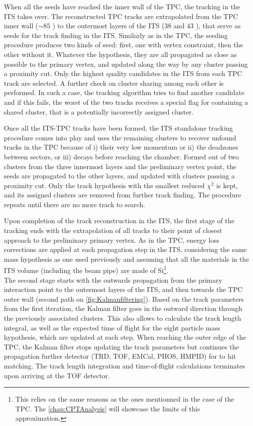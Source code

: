When all the seeds have reached the inner wall of the TPC, the tracking in the ITS takes over. The reconstructed TPC tracks are extrapolated from the TPC inner wall ($\sim 85$ \cm) to the outermost layers of the ITS (38 and 43 \cm), that serve as seeds for the track finding in the ITS. Similarly as in the TPC, the seeding procedure produces two kinds of seed: first, one with vertex constraint, then the other without it. Whatever the hypothesis, they are all propagated as close as possible to the primary vertex, and updated along the way by any cluster passing a proximity cut. Only the highest quality candidates in the ITS from each TPC track are selected. A further check on cluster sharing among each other is performed. In such a case, the tracking algorithm tries to find another candidate and if this fails, the worst of the two tracks receives a special flag for containing a shared cluster, that is a potentially incorrectly assigned cluster.

Once all the ITS-TPC tracks have been formed, the ITS standalone tracking procedure comes into play and uses the remaining clusters to recover unfound tracks in the TPC because of i) their very low momentum or ii) the deadzones between sectors, or iii) decays before reaching the chamber. Formed out of two clusters from the three innermost layers and the preliminary vertex point, the seeds are propagated to the other layers, and updated with clusters passing a proximity cut. Only the track hypothesis with the smallest reduced $\chi^{2}$ is kept, and its assigned clusters are removed from further track finding. The procedure repeats until there are no more track to search. 

Upon completion of the track reconstruction in the ITS, the first stage of the tracking ends with the extrapolation of all tracks to their point of closest approach to the preliminary primary vertex. As in the TPC, energy loss corrections are applied at each propagation step in the ITS, considering the same mass hypothesis as one used previously and assuming that all the materials in the ITS volume (including the beam pipe) are made of Si\footnote{This relies on the same reasons as the ones mentionned in the case of the TPC. The \chap\ref{chap:CPTAnalysis} will showcase the limits of this approximation.}.\\

The second stage starts with the outwards propagation from the primary interaction point to the outermost layers of the ITS, and then towards the TPC outer wall (second path on \fig\ref{fig:Kalmanfiltering}). Based on the track parameters from the first iteration, the Kalman filter goes in the outward direction through the previously associated clusters. This also allows to calculate the track length integral, as well as the expected time of flight for the eight particle mass hypothesis, which are updated at each step. When reaching the outer edge of the TPC, the Kalman filter stops updating the track parameters but continues the propagation further detector (TRD, TOF, EMCal, PHOS, HMPID) for to hit matching. The track length integration and time-of-flight calculations terminates upon arriving at the TOF detector. \\

